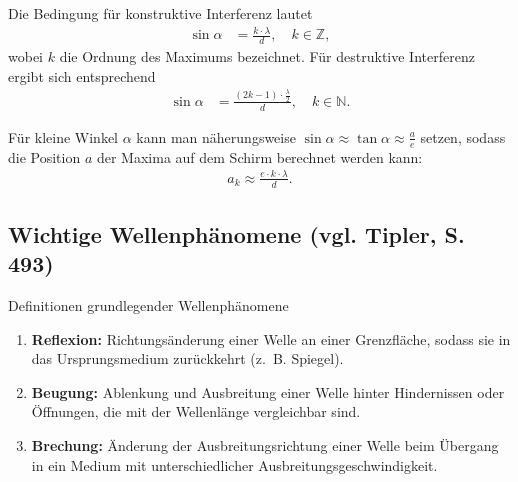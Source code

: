 \documentclass[11pt,a4paper,oneside]{article}
\newcommand{\lessondate}[1]{\noindent\hfill\textcolor{MarginalGray}{\textsc{#1}} \\ \vspace{0.5cm}}
\begin{document}
	Die Bedingung für konstruktive Interferenz lautet
	\begin{align*}
		\sin \alpha &= \frac{k \cdot \lambda}{d}, \quad k \in \mathbb{Z},
	\end{align*}
	wobei $k$ die Ordnung des Maximums bezeichnet. Für destruktive Interferenz ergibt sich entsprechend
	\begin{align*}
		\sin \alpha &= \frac{(2k - 1)\cdot \frac{\lambda}{2}}{d}, \quad k \in \mathbb{N}.
	\end{align*}
	
	Für kleine Winkel $\alpha$ kann man näherungsweise $\sin \alpha \approx \tan \alpha \approx \frac{a}{e}$ setzen, sodass die Position $a$ der Maxima auf dem Schirm berechnet werden kann:
	\begin{align*}
		a_k \approx \frac{e \cdot k \cdot \lambda}{d}.
	\end{align*}
	
	
	\subsection*{Wichtige Wellenphänomene (vgl. Tipler, S. 493)}
	
	\begin{theo}{Definitionen grundlegender Wellenphänomene}
		\begin{enumerate}
			\item \textbf{Reflexion:} Richtungsänderung einer Welle an einer Grenzfläche, sodass sie in das Ursprungsmedium zurückkehrt (z.~B. Spiegel).
			\item \textbf{Beugung:} Ablenkung und Ausbreitung einer Welle hinter Hindernissen oder Öffnungen, die mit der Wellenlänge vergleichbar sind.
			\item \textbf{Brechung:} Änderung der Ausbreitungsrichtung einer Welle beim Übergang in ein Medium mit unterschiedlicher Ausbreitungsgeschwindigkeit.
		\end{enumerate}
	\end{theo}
	
	
	
	
\end{document}
